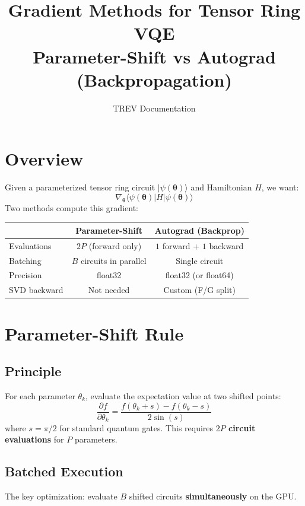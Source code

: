 \documentclass[11pt]{article}
\title{\textbf{Gradient Methods for Tensor Ring VQE}\\[4pt]
\large Parameter-Shift vs Autograd (Backpropagation)}
\author{TREV Documentation}
\date{}
\begin{document}
\maketitle

\section{Overview}

Given a parameterized tensor ring circuit $|\psi(\boldsymbol{\theta})\rangle$ and Hamiltonian $H$, we want:
\[
\nabla_{\boldsymbol{\theta}} \langle \psi(\boldsymbol{\theta}) | H | \psi(\boldsymbol{\theta}) \rangle
\]
Two methods compute this gradient:

\begin{center}
\begin{tabular}{lcc}
\toprule
& \textbf{Parameter-Shift} & \textbf{Autograd (Backprop)} \\
\midrule
Evaluations & $2P$ (forward only) & $1$ forward + $1$ backward \\
Batching & $B$ circuits in parallel & Single circuit \\
Precision & float32 & float32 (or float64) \\
SVD backward & Not needed & Custom (F/G split) \\
\bottomrule
\end{tabular}
\end{center}

\section{Parameter-Shift Rule}

\subsection{Principle}
For each parameter $\theta_k$, evaluate the expectation value at two shifted points:
\[
\frac{\partial f}{\partial \theta_k} = \frac{f(\theta_k + s) - f(\theta_k - s)}{2\sin(s)}
\]
where $s = \pi/2$ for standard quantum gates. This requires \textbf{$2P$ circuit evaluations} for $P$ parameters.

\subsection{Batched Execution}

The key optimization: evaluate $B$ shifted circuits \textbf{simultaneously} on the GPU.
\end{document}
